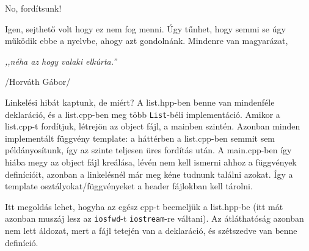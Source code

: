 \documentclass[a4paper,11.5pt]{article}
\begin{document}
	\medskip
	No, fordítsunk!
	
	\medskip
	Igen, sejthető volt hogy ez nem fog menni. Úgy tűnhet, hogy semmi se úgy működik ebbe a nyelvbe, ahogy azt gondolnánk. Mindenre van magyarázat,
	\begin{center}
		\textit{,,néha az hogy valaki elkúrta.''}
		
		/Horváth Gábor/
	\end{center}
	Linkelési hibát kaptunk, de miért? A list.hpp-ben benne van mindenféle deklaráció, és a list.cpp-ben meg több \texttt{List}-béli implementáció. Amikor a list.cpp-t fordítjuk, létrejön az object fájl, a mainben szintén. Azonban minden implementált függvény template: a háttérben a list.cpp-ben semmit sem példányosítunk, így az szinte teljesen üres fordítás után. A main.cpp-ben így hiába megy az object fájl kreálása, lévén nem kell ismerni ahhoz a függvények definícióit, azonban a linkelésnél már meg kéne tudnunk találni azokat. Így a template osztályokat/függvényeket a header fájlokban kell tárolni.
	
	Itt megoldás lehet, hogyha az egész cpp-t beemeljük a list.hpp-be (itt mát azonban muszáj lesz az \texttt{iosfwd}-t \texttt{iostream}-re váltani). Az átláthatóság azonban nem lett áldozat, mert a fájl tetején van a deklaráció, és szétszedve van benne definíció.
	
\end{document}
